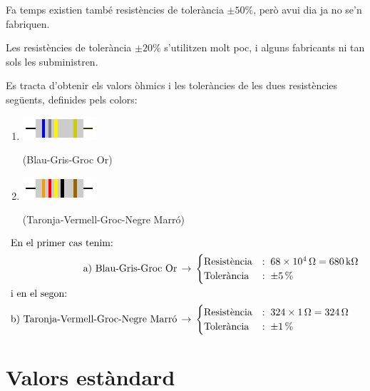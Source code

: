 Fa temps existien tamb\'{e} resist\`{e}ncies de toler\`{a}ncia $\pm50\unit{\%}$,
per\`{o} avui dia ja no se'n fabriquen.

Les resist\`{e}ncies de toler\`{a}ncia $\pm20\unit{\%}$ s'utilitzen molt poc, i alguns fabricants
ni tan sols les subministren.

\vspace{5mm}
\begin{exemple}
   Es tracta d'obtenir els valors \`{o}hmics i les toler\`{a}ncies de les dues resist\`{e}ncies seg\"{u}ents,
   definides pels colors:
\begin{enumerate}
   \renewcommand{\labelenumi}{\alph{enumi})}
   \item \begin{minipage}{1.8cm}
           \includegraphics{Imatges/Cap-Resistencies-R1.pdf}
        \end{minipage} (Blau-Gris-Groc Or)
   \item  \begin{minipage}{1.8cm}
           \includegraphics{Imatges/Cap-Resistencies-R2.pdf}
        \end{minipage} (Taronja-Vermell-Groc-Negre Marr\'{o})
\end{enumerate}
\begin{align*}
   \intertext{En el primer cas tenim:}
   \text{a) Blau-Gris-Groc Or}\,  &\rightarrow\,
   \begin{cases}
      \text{Resist\`{e}ncia} &:\; 68\times 10^4\mathrm{\,\mathrm{\Omega}} = 680\mathrm{\,k\mathrm{\Omega}} \\
      \text{Toler\`{a}ncia}  &:\; \pm5\mathrm{\,\%}
   \end{cases} \\
   \intertext{i en el segon:}
   \text{b) Taronja-Vermell-Groc-Negre Marr\'{o}}\,  &\rightarrow\,
   \begin{cases}
      \text{Resist\`{e}ncia} &:\; 324\times 1\mathrm{\,\mathrm{\Omega}} = 324\mathrm{\,\mathrm{\Omega}} \\
      \text{Toler\`{a}ncia}  &:\; \pm1\mathrm{\,\%}
   \end{cases}
\end{align*}
\end{exemple}

\section{Valors est\`{a}ndard} 

